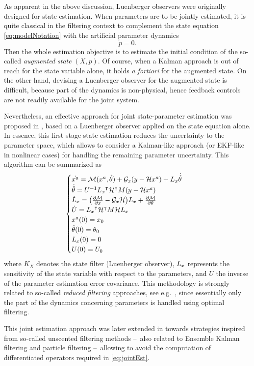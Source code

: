 As apparent in the above discussion, Luenberger observers were originally designed for state estimation. When parameters are to be jointly estimated, it is quite classical in the filtering context to complement the state equation \eqref{eq:modelNotation} with the artificial parameter dynamics
\begin{equation}
	\dot{p} = 0.
\end{equation}
Then the whole estimation objective is to estimate the initial condition of the so-called \emph{augmented state} $(X,p)$. Of course, when a Kalman approach is out of reach for the state variable alone, it holds \emph{a fortiori} for the augmented state. On the other hand, devising a Luenberger observer for the augmented state is difficult, because part of the dynamics is non-physical, hence feedback controls are not readily available for the joint system.

Nevertheless, an effective approach for joint state-parameter estimation was proposed in \cite{PM-DC-PLT-08}, based on a Luenberger observer applied on the state equation alone. In essence, this first stage state estimation reduces the uncertainty to the parameter space, which allows to consider a Kalman-like approach (or EKF-like in nonlinear cases) for handling the remaining parameter uncertainty. This algorithm can be summarized as
\begin{equation}\label{eq:jointEst}
	\begin{cases}
			\dot{x^a} = \mathcal{M}(x^a,\hat{\theta}) + \mathcal{G}_x(y-\mathcal{H}x^a) + L_{x}\dot{\hat{\theta}}\\
			\dot{\hat{\theta}} = U^{-1} {L_{x}}^\intercal \mathcal{H}^\intercal M (y-\mathcal{H}x^a) \\
			\dot{L}_x = \bigl( \frac{\partial \mathcal{M}}{\partial x} - \mathcal{G}_x\mathcal{H} \bigr) L_{x} + \frac{\partial \mathcal{M}}{\partial \theta}\\
			\dot{U} = {L_{x}}^\intercal \mathcal{H}^\intercal M \mathcal{H} L_{x} \\
			x^a(0) = x_0\\
			\hat{\theta}(0) = \theta_0 \\
			L_{x}(0) = 0 \\
			U(0) = U_0
	\end{cases}
\end{equation}
where $K_X$ denotes the state filter (Luenberger observer), $L_{x}$ represents the sensitivity of the state variable with respect to the parameters, and $U$ the inverse of the parameter estimation error covariance. This methodology is strongly related to so-called \emph{reduced filtering} approaches, see e.g.~\cite{Pham:1998p44}, since essentially only the part of the dynamics concerning parameters is handled using optimal filtering.

This joint estimation approach was later extended in \cite{PM-DC-10} towards strategies inspired from so-called unscented filtering methods --~also related to Ensemble Kalman filtering and particle filtering --~allowing to avoid the computation of differentiated operators required in \eqref{eq:jointEst}.
